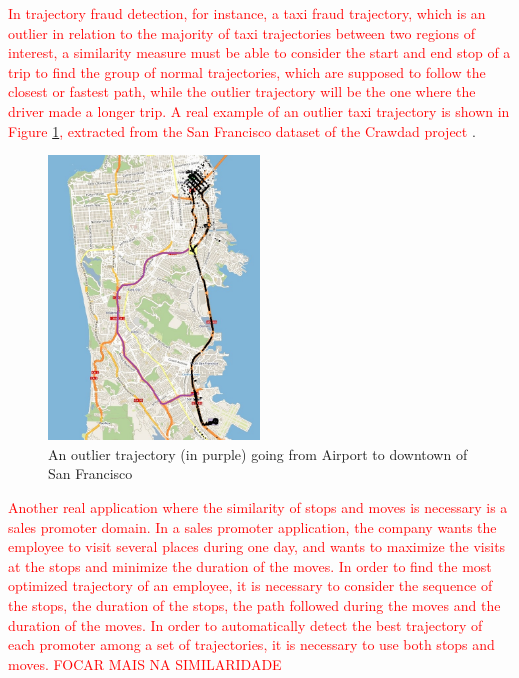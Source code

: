 \documentclass[12pt]{article}
\begin{document}
 \textcolor{red}{In trajectory fraud detection, for instance, a taxi fraud trajectory, which is an outlier in relation to the majority of taxi trajectories between two regions of interest, a similarity measure must be able to consider the start and end stop of a trip to find the group of normal trajectories, which are supposed to follow the closest or fastest path, while the outlier trajectory will be the one where the driver made a longer trip. A real example of an outlier taxi trajectory is shown in Figure \ref{fig:crawdad_outlier}, extracted from the San Francisco dataset of the Crawdad project} \citep{epfl-mobility-20090224}.
 
\begin{figure}[h]
\centering
\includegraphics[width=0.5\textwidth]{Images/CRAWDAD-Outlier.jpg}
\caption{\label{fig:crawdad_outlier} An outlier trajectory (in purple) going from Airport to downtown of San Francisco}
\end{figure}

\textcolor{red}{Another real application where the similarity of stops and moves is necessary is a sales promoter domain. In a sales promoter application, the company wants the employee to visit several places during one day, and wants to maximize the visits at the stops and minimize the duration of the moves. In order to find the most optimized trajectory of an employee, it is necessary to consider the sequence of the stops, the duration of the stops, the path followed during the moves and the duration of the moves. In order to automatically detect the best trajectory of each promoter among a set of trajectories, it is necessary to use both stops and moves. FOCAR MAIS NA SIMILARIDADE} 
 
\end{document}
